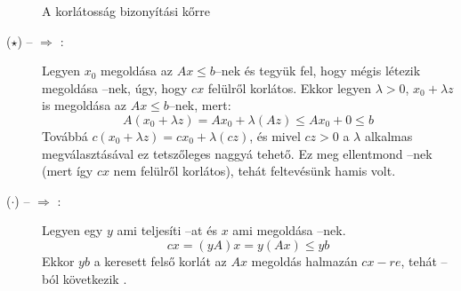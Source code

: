 \begin{figure}[htbp]
\caption{A korlátosság bizonyítási kőrre}
\label{fig:KorBizKor}
\centering {} 
\end{figure}            
\begin{description}
  \item[($\star$) --  $\Rightarrow$ :]  Legyen $x_0$
  megoldása az $Ax \leq b$--nek és tegyük fel, hogy mégis létezik megoldása
  --nek, úgy, hogy $cx$ felülről korlátos. Ekkor legyen $\lambda >
  0$, $x_0 + \lambda z$ is megoldása az $Ax \leq b$--nek, mert:
  \[ A(x_0+ \lambda z) = Ax_0 + \lambda (Az) \leq A x_0 + 0 \leq b \] Továbbá
  $c(x_0 + \lambda z ) = c x_0 + \lambda (cz)$, és mivel $cz>0$ a $\lambda$
  alkalmas megválasztásával ez tetszőleges naggyá tehető. Ez meg ellentmond
  --nek (mert így $cx$ nem felülről korlátos), tehát feltevésünk
  hamis volt.
  \item[($\cdot$) --  $\Rightarrow$ :]  Legyen egy $y$
  ami teljesíti --at és $x$ ami megoldása --nek. 
  \[ cx = (yA)x = y(Ax) \leq yb \]
  Ekkor $yb$ a keresett felső korlát az $Ax$ megoldás halmazán $cx-re$, tehát
  --ból következik .
\end{description}